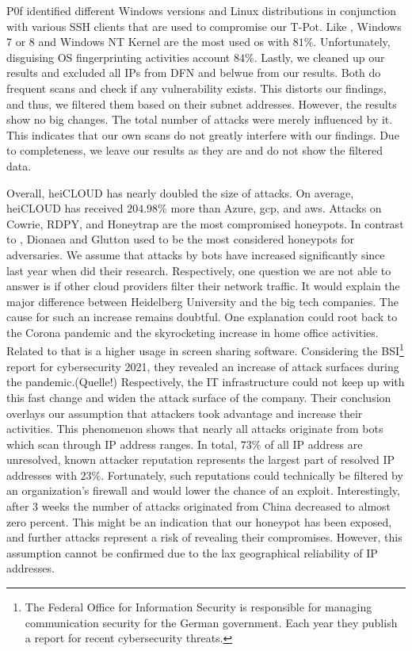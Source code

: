 P0f identified different Windows versions and Linux distributions in conjunction with various SSH clients that are used to compromise our T-Pot.
Like \citet{Kelly2021}, Windows 7 or 8 and Windows NT Kernel are the most used \ac{os} with $81\%$.
Unfortunately, disguising OS fingerprinting activities account $84\%$.
Lastly, we cleaned up our results and excluded all IPs from DFN and \acs{belwue} from our results.
Both do frequent scans and check if any vulnerability exists.
This distorts our findings, and thus, we filtered them based on their subnet addresses.
However, the results show no big changes.
The total number of attacks were merely influenced by it.
This indicates that our own scans do not greatly interfere with our findings.
Due to completeness, we leave our results as they are and do not show the filtered data.

Overall, heiCLOUD has nearly doubled the size of attacks.
On average, heiCLOUD has received $204.98\%$ more than Azure, \ac{gcp}, and \ac{aws}.
Attacks on Cowrie, RDPY, and Honeytrap are the most compromised honeypots.
In contrast to \citet{Kelly2021}, Dionaea and Glutton used to be the most considered honeypots for adversaries.
We assume that attacks by bots have increased significantly since last year when \citet{Kelly2021} did their research.
Respectively, one question we are not able to answer is if other cloud providers filter their network traffic.
It would explain the major difference between Heidelberg University and the big tech companies.
The cause for such an increase remains doubtful.
One explanation could root back to the Corona pandemic and the skyrocketing increase in home office activities.
Related to that is a higher usage in screen sharing software.
Considering the BSI\footnote{The Federal Office for Information Security is responsible for managing communication security for the German government. Each year they publish a report for recent cybersecurity threats.} report for cybersecurity 2021, they revealed an increase of attack surfaces during the pandemic.(Quelle!)
Respectively, the IT infrastructure could not keep up with this fast change and widen the attack surface of the company.
Their conclusion overlays our assumption that attackers took advantage and increase their activities.
This phenomenon shows that nearly all attacks originate from bots which scan through IP address ranges.
In total, $73\%$ of all IP address are unresolved, known attacker reputation represents the largest part of resolved IP addresses with $23\%$.
Fortunately, such reputations could technically be filtered by an organization's firewall and would lower the chance of an exploit.
Interestingly, after 3 weeks the number of attacks originated from China decreased to almost zero percent.
This might be an indication that our honeypot has been exposed, and further attacks represent a risk of revealing their compromises.
However, this assumption cannot be confirmed due to the lax geographical reliability of IP addresses.

